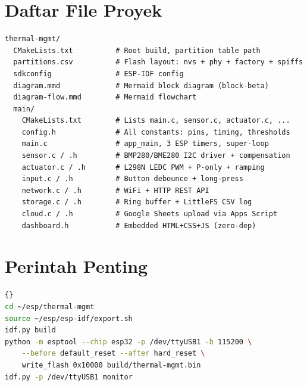 \documentclass[11pt,a4paper]{article}
\begin{document}
\section{Daftar File Proyek}

\begin{lstlisting}[caption={Struktur direktori \texttt{thermal-mgmt/}}]
thermal-mgmt/
  CMakeLists.txt          # Root build, partition table path
  partitions.csv          # Flash layout: nvs + phy + factory + spiffs
  sdkconfig               # ESP-IDF config
  diagram.mmd             # Mermaid block diagram (block-beta)
  diagram-flow.mmd        # Mermaid flowchart
  main/
    CMakeLists.txt        # Lists main.c, sensor.c, actuator.c, ...
    config.h              # All constants: pins, timing, thresholds
    main.c                # app_main, 3 ESP timers, super-loop
    sensor.c / .h         # BMP280/BME280 I2C driver + compensation
    actuator.c / .h       # L298N LEDC PWM + P-only + ramping
    input.c / .h          # Button debounce + long-press
    network.c / .h        # WiFi + HTTP REST API
    storage.c / .h        # Ring buffer + LittleFS CSV log
    cloud.c / .h          # Google Sheets upload via Apps Script
    dashboard.h           # Embedded HTML+CSS+JS (zero-dep)
\end{lstlisting}

\section{Perintah Penting}

\begin{lstlisting}[language=bash,caption={Build, flash, monitor}]{}
cd ~/esp/thermal-mgmt
source ~/esp/esp-idf/export.sh
idf.py build
python -m esptool --chip esp32 -p /dev/ttyUSB1 -b 115200 \
    --before default_reset --after hard_reset \
    write_flash 0x10000 build/thermal-mgmt.bin
idf.py -p /dev/ttyUSB1 monitor
\end{lstlisting}
\end{document}
